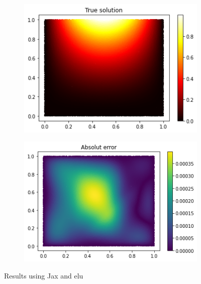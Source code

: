 \begin{figure}[H]
\begin{subfigure}{.45\textwidth}
    \includegraphics[width=.8\linewidth]{images/NN_Jax_PDE8_files_elu/NN_Jax_PDE8_22_0.png}
    \label{fig:sub3}
    \end{subfigure}
\begin{subfigure}{.45\textwidth}
    \centering
    \includegraphics[width=.8\linewidth]{images/NN_Jax_PDE8_files_elu/NN_Jax_PDE8_24_0.png}
    \label{fig:sub4}
\end{subfigure}
\caption{Results using Jax and elu}
\label{fig:test}
\end{figure}

\vspace{-0.5cm}
